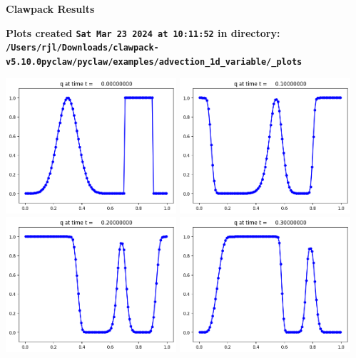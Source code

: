 \documentclass[11pt]{article}
\begin{document}
        \begin{center}{\Large\bf Clawpack Results}\vskip 5pt
        
        \bf Plots created {\tt Sat Mar 23 2024 at 10:11:52} in directory: \vskip 5pt
        \verb+/Users/rjl/Downloads/clawpack-v5.10.0pyclaw/pyclaw/examples/advection_1d_variable/_plots+
        \end{center}
        \vskip 5pt
        \includegraphics[width=0.475\textwidth]{frame0000fig1.png}
\includegraphics[width=0.475\textwidth]{frame0001fig1.png}
\vskip 10pt 
\includegraphics[width=0.475\textwidth]{frame0002fig1.png}
\includegraphics[width=0.475\textwidth]{frame0003fig1.png}
\end{document}

